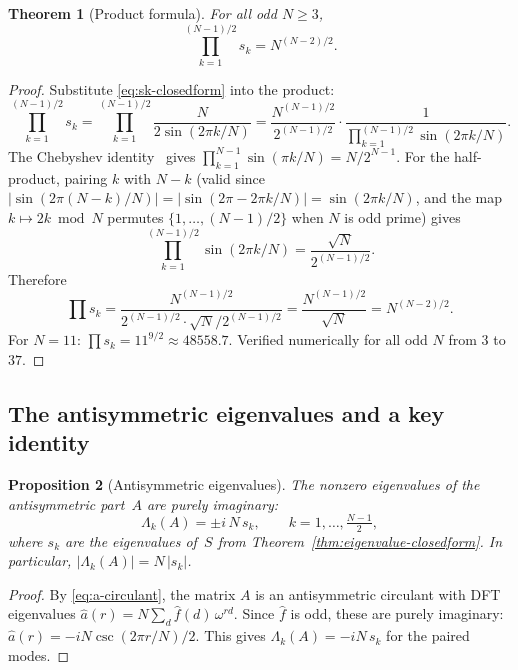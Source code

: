 \documentclass[aip,jmp,reprint,superscriptaddress,floatfix,nofootinbib]{revtex4-2}
\newtheorem{theorem}{Theorem}
\newtheorem{proposition}[theorem]{Proposition}
\theoremstyle{definition}
\theoremstyle{remark}
\begin{document}
\begin{theorem}[Product formula]
\label{thm:product-formula}
For all odd $N \geq 3$,
\begin{equation}\label{eq:product-formula}
  \prod_{k=1}^{(N-1)/2} s_k = N^{(N-2)/2}.
\end{equation}
\end{theorem}

\begin{proof}
Substitute \eqref{eq:sk-closedform} into the product:
\[
  \prod_{k=1}^{(N-1)/2} s_k
  = \prod_{k=1}^{(N-1)/2} \frac{N}{2\sin(2\pi k/N)}
  = \frac{N^{(N-1)/2}}{2^{(N-1)/2}}
    \cdot \frac{1}{\prod_{k=1}^{(N-1)/2}\sin(2\pi k/N)}.
\]
The Chebyshev identity~\cite{chebyshev} gives
$\prod_{k=1}^{N-1}\sin(\pi k/N) = N/2^{N-1}$.
For the half-product, pairing $k$ with $N{-}k$ (valid since
$|\sin(2\pi(N{-}k)/N)| = |\sin(2\pi - 2\pi k/N)| = \sin(2\pi k/N)$,
and the map $k\mapsto 2k \bmod N$ permutes $\{1,\ldots,(N{-}1)/2\}$
when $N$ is odd prime) gives
\[
  \prod_{k=1}^{(N-1)/2}\sin(2\pi k/N)
  = \frac{\sqrt{N}}{2^{(N-1)/2}}.
\]
Therefore
\[
  \prod s_k = \frac{N^{(N-1)/2}}{2^{(N-1)/2}\cdot\sqrt{N}/2^{(N-1)/2}}
  = \frac{N^{(N-1)/2}}{\sqrt{N}} = N^{(N-2)/2}.
\]
For $N{=}11$: $\prod s_k = 11^{9/2} \approx 48558.7$.
Verified numerically for all odd $N$ from $3$ to $37$.
\end{proof}

\subsection{The antisymmetric eigenvalues and a key identity}

\begin{proposition}[Antisymmetric eigenvalues]
\label{prop:a-eigenvalues}
The nonzero eigenvalues of the antisymmetric part~$A$ are purely imaginary:
\begin{equation}\label{eq:a-eigenvalues}
  \Lambda_k(A) = \pm i\,N\,s_k, \qquad k = 1,\ldots,\tfrac{N{-}1}{2},
\end{equation}
where $s_k$ are the eigenvalues of~$S$ from
Theorem~\ref{thm:eigenvalue-closedform}.  In particular,
$|\Lambda_k(A)| = N\,|s_k|$.
\end{proposition}

\begin{proof}
By \eqref{eq:a-circulant}, the matrix $A$ is an antisymmetric circulant
with DFT eigenvalues
$\hat{a}(r) = N\sum_d \hat{f}(d)\,\omega^{rd}$.
Since $\hat{f}$ is odd, these are purely imaginary:
$\hat{a}(r) = -iN\csc(2\pi r/N)/2$.
This gives $\Lambda_k(A) = -iN\,s_k$ for the paired modes.
\end{proof}
\end{document}

